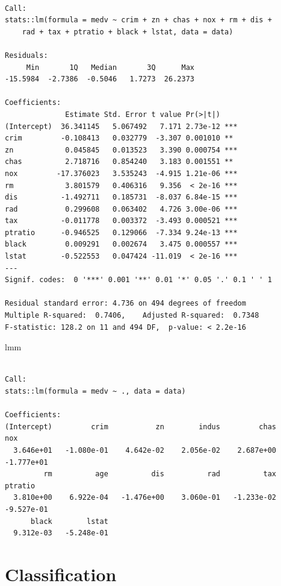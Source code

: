 \documentclass[
  letterpaper,
  DIV=11,
  numbers=noendperiod]{scrreprt}
\newenvironment{Shaded}{\begin{snugshade}}{\end{snugshade}}
\newcommand{\NormalTok}[1]{\textcolor[rgb]{0.33,0.33,0.33}{#1}}
\begin{document}
\begin{verbatim}

Call:
stats::lm(formula = medv ~ crim + zn + chas + nox + rm + dis + 
    rad + tax + ptratio + black + lstat, data = data)

Residuals:
     Min       1Q   Median       3Q      Max 
-15.5984  -2.7386  -0.5046   1.7273  26.2373 

Coefficients:
              Estimate Std. Error t value Pr(>|t|)    
(Intercept)  36.341145   5.067492   7.171 2.73e-12 ***
crim         -0.108413   0.032779  -3.307 0.001010 ** 
zn            0.045845   0.013523   3.390 0.000754 ***
chas          2.718716   0.854240   3.183 0.001551 ** 
nox         -17.376023   3.535243  -4.915 1.21e-06 ***
rm            3.801579   0.406316   9.356  < 2e-16 ***
dis          -1.492711   0.185731  -8.037 6.84e-15 ***
rad           0.299608   0.063402   4.726 3.00e-06 ***
tax          -0.011778   0.003372  -3.493 0.000521 ***
ptratio      -0.946525   0.129066  -7.334 9.24e-13 ***
black         0.009291   0.002674   3.475 0.000557 ***
lstat        -0.522553   0.047424 -11.019  < 2e-16 ***
---
Signif. codes:  0 '***' 0.001 '**' 0.01 '*' 0.05 '.' 0.1 ' ' 1

Residual standard error: 4.736 on 494 degrees of freedom
Multiple R-squared:  0.7406,    Adjusted R-squared:  0.7348 
F-statistic: 128.2 on 11 and 494 DF,  p-value: < 2.2e-16
\end{verbatim}

\begin{Shaded}
\begin{Highlighting}[]
\NormalTok{lmm}
\end{Highlighting}
\end{Shaded}

\begin{verbatim}

Call:
stats::lm(formula = medv ~ ., data = data)

Coefficients:
(Intercept)         crim           zn        indus         chas          nox  
  3.646e+01   -1.080e-01    4.642e-02    2.056e-02    2.687e+00   -1.777e+01  
         rm          age          dis          rad          tax      ptratio  
  3.810e+00    6.922e-04   -1.476e+00    3.060e-01   -1.233e-02   -9.527e-01  
      black        lstat  
  9.312e-03   -5.248e-01  
\end{verbatim}


\hypertarget{classification}{%
\chapter{Classification}\label{classification}}
\end{document}
